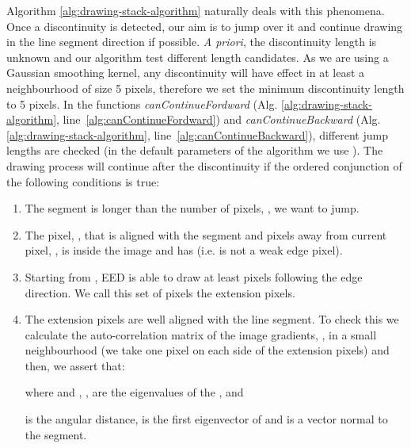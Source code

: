 \documentclass[preprint,12pt]{elsarticle}
\begin{document}
Algorithm \ref{alg:drawing-stack-algorithm} naturally deals with this phenomena. 
Once a discontinuity is detected, our aim is to jump over it and continue drawing in the line segment direction if possible. \emph{A priori}, the discontinuity length  is unknown and our algorithm test different length candidates. As we are using a  Gaussian smoothing kernel, any  discontinuity will have effect in at least a neighbourhood of size 5 pixels, therefore we set the minimum discontinuity length to 5 pixels. In the functions \textit{canContinueFordward} (Alg. \ref{alg:drawing-stack-algorithm}, line~\ref{alg:canContinueFordward}) and \textit{canContinueBackward} (Alg. \ref{alg:drawing-stack-algorithm}, line~\ref{alg:canContinueBackward}), different jump lengths  are checked (in the default parameters of the algorithm we use ). The drawing process will continue after the discontinuity if the ordered conjunction of the following conditions is true:
\begin{enumerate}
    \item The segment is longer than the number of pixels, , we want to jump.
    \item The pixel, , that is aligned with the segment and  pixels away from current pixel, , is inside the image and has  (i.e. is not a weak edge pixel).
    \item Starting from , EED is able to draw at least  pixels following the edge direction. We call this set of  pixels the extension pixels.
    \item The extension pixels are well aligned with the line segment. To check this we calculate the auto-correlation matrix of the image gradients, , in a small neighbourhood (we take one pixel on each side of the extension pixels) and then, we assert that:
    
    where  and , , are the eigenvalues of the , and 
    
     is the angular distance,  is the first eigenvector of  and  is a vector normal to the segment.
\end{enumerate}
\end{document}
